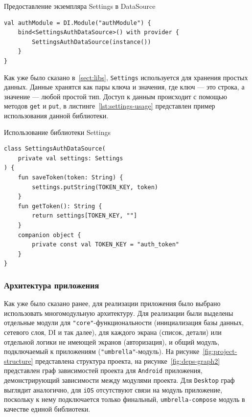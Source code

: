 \documentclass[14pt, russian]{scrartcl}
\begin{document}
\begin{listing}[!htb]
\caption{Предоставление экземпляра Settings в DataSource}
\label{lst:bind-settings}
\begin{verbatim}
val authModule = DI.Module("authModule") {
    bind<SettingsAuthDataSource>() with provider {
        SettingsAuthDataSource(instance())
    }
}
\end{verbatim}
\end{listing}

Как уже было сказано в~\ref{sect:libs}, \texttt{Settings} используется для хранения простых данных. Данные хранятся как пары ключа и значения, где ключ --- это строка, а значение --- любой простой тип. Доступ к данным происходит с помощью методов \texttt{get} и \texttt{put}, в листинге~\ref{lst:settings-usage} представлен пример использования данной библиотеки.

\begin{listing}[!htb]
\caption{Использование библиотеки Settings}
\label{lst:settings-usage}
\begin{verbatim}
class SettingsAuthDataSource(
    private val settings: Settings
) {
    fun saveToken(token: String) {
        settings.putString(TOKEN_KEY, token)
    }
    fun getToken(): String {
        return settings[TOKEN_KEY, ""]
    }
    companion object {
        private const val TOKEN_KEY = "auth_token"
    }
}
\end{verbatim}
\end{listing}

\subsubsection{Архитектура приложения}

Как уже было сказано ранее, для реализации приложения было выбрано использовать многомодульную архитектуру. Для реализации были выделены отдельные модули для \texttt{"core"}-функциональности (инициализация базы данных, сетевого слоя, DI и так далее), для каждого экрана (список, детали) или отдельной логики не имеющей экранов (авторизация), и общий модуль, подключаемый к приложениям (\texttt{"umbrella"}-модуль). На рисунке~\ref{fig:project-structure} представлена структура проекта, на рисунке~\ref{fig:deps-graph2} представлен граф зависимостей проекта для \texttt{Android} приложения, демонстрирующий зависимости между модулями проекта. Для \texttt{Desktop} граф выглядит аналогично, для \texttt{iOS} отсутствуют связи на модуль приложение, поскольку к нему подключается только финальный, \texttt{umbrella-compose} модуль в качестве единой библиотеки.
\end{document}
